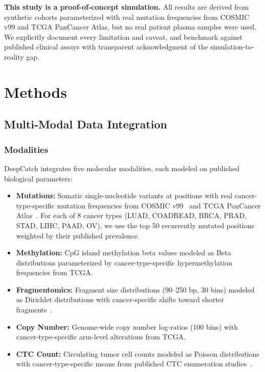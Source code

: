 \documentclass[10pt,a4paper]{article}
\begin{document}
\textbf{This study is a proof-of-concept simulation.} All results are derived from synthetic cohorts parameterized with real mutation frequencies from COSMIC v99 and TCGA PanCancer Atlas, but no real patient plasma samples were used. We explicitly document every limitation and caveat, and benchmark against published clinical assays with transparent acknowledgment of the simulation-to-reality gap.


\section{Methods}

\subsection{Multi-Modal Data Integration}

\subsubsection{Modalities}

DeepCatch integrates five molecular modalities, each modeled on published biological parameters:

\begin{itemize}[nosep]
\item \textbf{Mutations:} Somatic single-nucleotide variants at positions with real cancer-type-specific mutation frequencies from COSMIC v99~\cite{tate2019cosmic} and TCGA PanCancer Atlas~\cite{ellrott2018scalable}. For each of 8 cancer types (LUAD, COADREAD, BRCA, PRAD, STAD, LIHC, PAAD, OV), we use the top 50 recurrently mutated positions weighted by their published prevalence.

\item \textbf{Methylation:} CpG island methylation beta values modeled as Beta distributions parameterized by cancer-type-specific hypermethylation frequencies from TCGA.

\item \textbf{Fragmentomics:} Fragment size distributions (90--250 bp, 30 bins) modeled as Dirichlet distributions with cancer-specific shifts toward shorter fragments~\cite{mouliere2018enhanced,cristiano2019genome}.

\item \textbf{Copy Number:} Genome-wide copy number log-ratios (100 bins) with cancer-type-specific arm-level alterations from TCGA.

\item \textbf{CTC Count:} Circulating tumor cell counts modeled as Poisson distributions with cancer-type-specific means from published CTC enumeration studies~\cite{allard2004tumor}.
\end{itemize}
\end{document}
